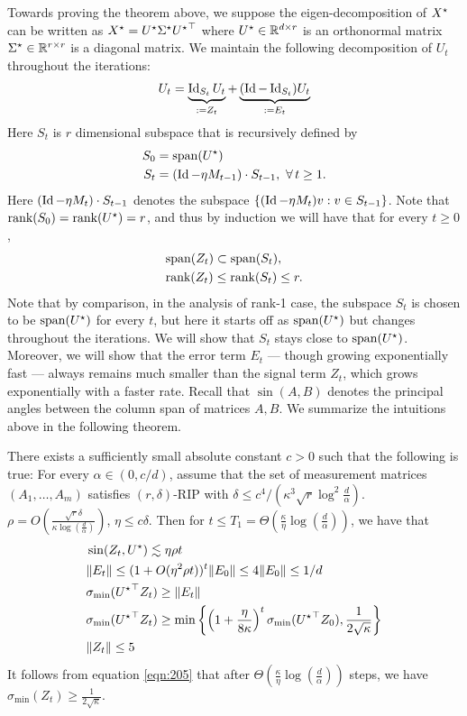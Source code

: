 Towards proving the theorem above, we suppose the eigen-decomposition of ${X}^\star$ can be written as ${X}^\star = {{U}^\star} {{\Sigma}^\star}{{U}^\star}^{\top}$ where ${{U}^\star} \in \mathbb{R}^{d \times r}$ is an orthonormal matrix ${{\Sigma}^\star} \in \mathbb{R}^{r \times r}$ is a diagonal matrix. We maintain the following decomposition of $U_t$ throughout the iterations: 
\begin{align}
U_t = \underbrace{\operatorname{Id}_{S_t}U_t}_{:=Z_t} + \underbrace{(\operatorname{Id} - \operatorname{Id}_{S_t}) U_t}_{:=E_t}\label{eqn:def-ze}
\end{align}
Here $S_t$ is $r$ dimensional subspace that is recursively defined by 
\begin{align}
S_0 &= \textup{span}({{U}^\star})  \\
S_t &= (\operatorname{Id}-\eta M_{t-1})\cdot S_{t-1},~\forall\, t \ge 1.
\end{align}
Here $(\operatorname{Id}-\eta M_t)\cdot S_{t-1}$ denotes the subspace $\{(\operatorname{Id}-\eta M_t)v : v\in S_{t-1}\}$. Note that $\textup{rank}(S_0)= \textup{rank}({{U}^\star}) = r$, and thus by induction we will have that for every $t \ge 0$, 
\begin{align*}
& \textup{span}(Z_t)\subset \textup{span}(S_t), \\
&\textup{rank}(Z_t)  \le \textup{rank}(S_t) \le r.
\end{align*}
Note that by comparison, in the analysis of rank-1 case, the subspace $S_t$ is chosen to be $\textup{span}({{U}^\star})$ for every $t$, but here it starts off as $\textup{span}({{U}^\star})$ but changes throughout the iterations. We will show that $S_t$ stays close to $\textup{span}({{U}^\star})$. Moreover, we will show that the error term $E_t$ --- though growing exponentially fast --- always remains much smaller than the signal term $Z_t$, which grows exponentially with a faster rate. Recall that $\sin(A,B)$ denotes the principal angles between the column span of matrices $A,B$. We summarize the intuitions above in the following theorem. 
\begin{thm}\label{thm:induction}	
	There exists a sufficiently small absolute constant $c > 0$ such that the following is true: For every $\alpha \in (0, c/d)$, assume that the set of measurement matrices $(A_1,\dots, A_m)$ satisfies $(r,\delta)$-RIP with $\delta \le c^4/(\kappa^3\sqrt{r} \log^2 \frac{d}{\alpha})$. $\rho = O(\frac{\sqrt{r}\delta}{\kappa\log(\frac d{\alpha})})$, $\eta \le c\delta$.
	Then for $t \le T_1 = \Theta({\frac{\kappa}{\eta} \log(\frac d {\alpha})})$, we have that
	\begin{align}
	& \sin(Z_t, {{U}^\star}) \lesssim \eta \rho t \label{eqn:201}\\
	& \|E_t\|\le (1+ O(\eta^2 \rho t))^t\|E_0\| \le 4\|E_0\|\le 1/d\label{eqn:202}\\
	& \sigma_{\min}({U^\star}^\top Z_t)\ge \|E_t\| \label{eqn:203}\\
	&	\sigma_{\min}({{U}^\star}^\top Z_{t})\geq \min\left\{\left(1+\frac{\eta}{8\kappa}\right)^t\sigma_{\min}({{U}^\star}^\top  Z_0), \frac{1}{2\sqrt{\kappa}} \right\}\label{eqn:205}\\
	& \|Z_{t}\|\le 5\label{eqn:204}
	\end{align}
	It follows from equation \eqref{eqn:205} that after $\Theta(\frac{\kappa}{\eta}\log(\frac d{\alpha}))$ steps, we have
	$\sigma_{\min}(Z_{t}) \ge \frac 1 {2\sqrt{\kappa}}.$
\end{thm}
